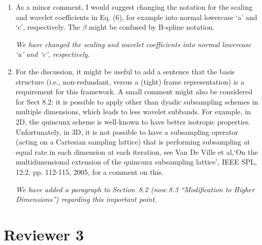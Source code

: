 \documentclass{article}
\begin{document}
\begin{enumerate}
    \item As a minor comment, I would suggest changing the notation for the scaling and wavelet coefficients in Eq. (6), for example into normal lowercase `a' and `c', respectively. The $\beta$ might be confused by B-spline notation. 

	\emph{We have changed the scaling and wavelet coefficients into normal lowercase `a' and `c', respectively.}

\item For the discussion, it might be useful to add a sentence that the basis structure (i.e., non-redundant, versus a (tight) frame representation) is a requirement for this framework. A small comment might also be considered for Sect 8.2: it is possible to apply other than dyadic subsampling schemes in multiple dimensions, which leads to less wavelet subbands. For example, in 2D, the quincunx scheme is well-known to have better isotropic properties. Unfortunately, in 3D, it is not possible to have a subsampling operator (acting on a Cartesian sampling lattice) that is performing subsampling at equal rate in each dimension at each iteration, see Van De Ville et al,`On the multidimensional extension of the quincunx subsampling lattice', IEEE SPL, 12:2, pp.  112-115, 2005, for a comment on this. 

\emph{We have added a paragraph  to Section~8.2 (now 8.3 ``Modification to Higher Dimensions'') regarding this important point.}


\end{enumerate}  

    \section{Reviewer 3}  
\end{document}
